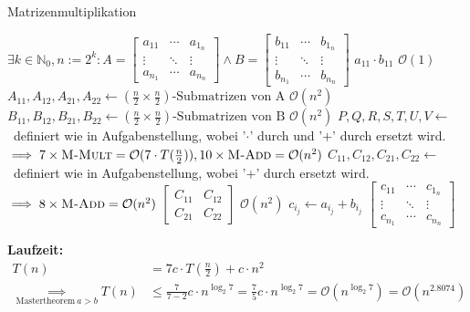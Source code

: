 \begin{algorithm}
	\caption{Matrizenmultiplikation}
	\begin{algorithmic}[1]
		\Require $\exists k \in \mathbb{N}_0, n := 2^k:
		A = \begin{bmatrix} a_{1 1} & \cdots & a_1_n \\ \vdots & \ddots & \vdots \\ a_n_1 & \cdots & a_n_n \end{bmatrix} \land
		B = \begin{bmatrix} b_{1 1} & \cdots & b_1_n \\ \vdots & \ddots & \vdots \\ b_n_1 & \cdots & b_n_n \end{bmatrix}$
		\Statex
				\State \Return $a_{1 1} \cdot b_{1 1}$ \Comment $\mathcal{O}(1)$
			\EndIf
			\Statex
			\State $A_{1 1}, A_{1 2}, A_{2 1}, A_{2 2} \gets (\frac{n}{2} \times \frac{n}{2})\text{-Submatrizen von A}$ \Comment $\mathcal{O}(n^2)$
			\State $B_{1 1}, B_{1 2}, B_{2 1}, B_{2 2} \gets (\frac{n}{2} \times \frac{n}{2})\text{-Submatrizen von B}$ \Comment $\mathcal{O}(n^2)$
			\Statex
			\State $P, Q, R, S, T, U, V \gets$\ definiert wie in Aufgabenstellung, wobei '$\cdot$' durch \mbox{} und '$+$' durch  ersetzt wird. $\implies 7 \times \Call{M-Mult}{} = \mathcal{O}(7 \cdot T(\frac{n}{2})), 10 \times \Call{M-Add}{} = \mathcal{O}(n^2)$
			\Statex
			\State $C_{1 1}, C_{1 2}, C_{2 1}, C_{2 2} \gets$\ definiert wie in Aufgabenstellung, wobei '$+$' durch  ersetzt wird. $\implies 8 \times \Call{M-Add}{} = \mathcal{O}(n^2)$
			\Statex
			\State \Return $\begin{bmatrix}
				C_{1 1} & C_{1 2} \\
				C_{2 1} & C_{2 2}
			\end{bmatrix}$ \Comment $\mathcal{O}(n^2)$
		\EndFunction
		\Statex
				\State $c_i_j \gets a_i_j + b_i_j$
			\EndFor
			\Statex
			\State \Return $\begin{bmatrix} c_{1 1} & \cdots & c_1_n \\ \vdots & \ddots & \vdots \\ c_n_1 & \cdots & c_n_n \end{bmatrix}$
		\EndFunction
	\end{algorithmic}
\end{algorithm}

\textbf{Laufzeit:}
\begin{align*}
	T(n) &= 7c \cdot T(\frac{n}{2}) + c \cdot n^2 \\
	\underset{\mathrm{Mastertheorem}\ a > b}{\implies} T(n) &\le \frac{7}{7 - 2}c \cdot n^{\log_2{7}} = \frac{7}{5}c \cdot n^{\log_2{7}} = \mathcal{O}(n^{\log_2{7}}) = \mathcal{O}(n^{2.8074})
\end{align*}

